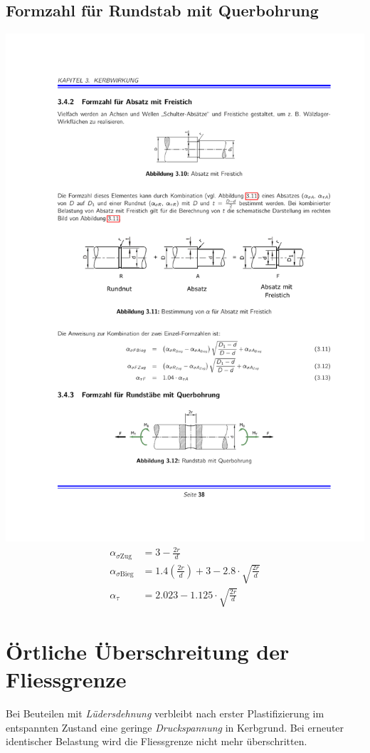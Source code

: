 	\subsection{Formzahl für Rundstab mit Querbohrung} %
		\includegraphics[width=\columnwidth]{graphics/rundstab_querbohrung}
		\begin{align*}
			\alpha_{\sigma\text{Zug}} &= 3 - \frac{2r}{d} \\
			\alpha_{\sigma\text{Bieg}} &= 1.4 \left( \frac{2r}{d}\right) + 3 - 2.8\cdot \sqrt{\frac{2r}{d}} \\
			\alpha_{\tau} &= 2.023 - 1.125\cdot\sqrt{\frac{2r}{d}}
		\end{align*}
\section{Örtliche Überschreitung der Fliessgrenze} %
	Bei Beuteilen mit \emph{Lüdersdehnung} verbleibt nach erster Plastifizierung im entspannten Zustand eine geringe \emph{Druckspannung} in Kerbgrund. Bei erneuter identischer Belastung wird die Fliessgrenze nicht mehr überschritten.
